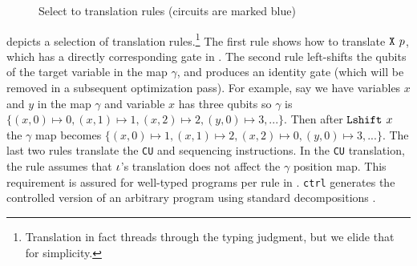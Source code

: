 \begin{figure}[t]
{\Small

  \begin{mathpar}
          
    
     
  
  \end{mathpar}
}
\vspace*{-1em}
\caption{Select \oqasm to \sqir translation rules (\sqir circuits are marked blue)}
\label{fig:compile-vqir}
\end{figure}

 depicts a selection of translation rules.\footnote{Translation in fact threads through the typing judgment, but we elide that for simplicity.}
The first rule shows how to translate
$\inot{p}$, which has a directly corresponding gate in \sqir.
The second rule left-shifts the qubits of the target variable in the
map $\gamma$, and produces an identity gate (which will be removed in a subsequent optimization pass).
For example, say we have variables $x$ and $y$ in the map $\gamma$ and variable $x$ has three qubits so $\gamma$ is $\{(x,0)\mapsto 0,(x,1)\mapsto 1, (x,2)\mapsto 2,(y,0)\mapsto 3,...\}$.
Then after $\ilshift{x}$ the $\gamma$ map becomes $\{(x,0)\mapsto 1,(x,1)\mapsto 2, (x,2)\mapsto 0,(y,0)\mapsto 3,...\}$. 
%
The last two rules translate the \texttt{CU} and sequencing instructions. In the \texttt{CU} translation, the rule assumes that $\instr$'s translation does not affect the $\gamma$ position map. This requirement is assured for well-typed programs per rule  in . \texttt{ctrl} generates the controlled version of an arbitrary \sqir program using standard decompositions \cite[Chapter 4.3]{mike-and-ike}.

